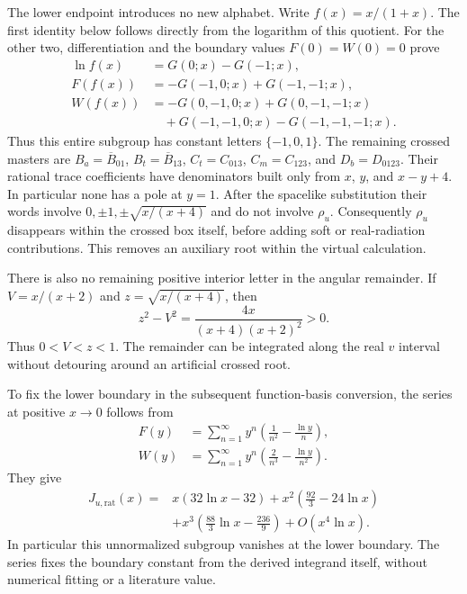The lower endpoint introduces no new alphabet. Write
$f(x)=x/(1+x)$. The first identity below follows directly from
the logarithm of this quotient. For the other two, differentiation
and the boundary values $F(0)=W(0)=0$ prove
\begin{align}
 \ln f(x)&=G(0;x)-G(-1;x),\\
 F(f(x))&=-G(-1,0;x)+G(-1,-1;x),\\
 W(f(x))&=-G(0,-1,0;x)+G(0,-1,-1;x)\\
        &\quad+G(-1,-1,0;x)-G(-1,-1,-1;x).
\end{align}
Thus this entire subgroup has constant letters $\{-1,0,1\}$.
The remaining crossed masters are
$B_a=\overline B_{01}$, $B_t=\overline B_{13}$,
$C_t=C_{013}$, $C_m=C_{123}$, and $D_b=D_{0123}$.
Their rational trace coefficients have denominators built only
from $x$, $y$, and $x-y+4$. In particular none has a pole at
$y=1$. After the spacelike substitution their words involve
$0,\pm1,\pm\sqrt{x/(x+4)}$ and do not involve $\rho_u$.
Consequently $\rho_u$ disappears within the crossed box itself,
before adding soft or real-radiation contributions. This removes an auxiliary root within the virtual calculation.

There is also no remaining positive interior letter in the angular
remainder. If $V=x/(x+2)$ and $z=\sqrt{x/(x+4)}$, then
\begin{equation}
 z^2-V^2=\frac{4x}{(x+4)(x+2)^2}>0.
\end{equation}
Thus $0<V<z<1$. The remainder can be integrated along the real
$v$ interval without detouring around an artificial crossed root.

To fix the lower boundary in the subsequent function-basis
conversion, the series at positive $x\to0$ follows from
\begin{align}
 F(y)&=\sum_{n=1}^{\infty}y^n
             \left(\frac1{n^2}-\frac{\ln y}{n}\right),\\
 W(y)&=\sum_{n=1}^{\infty}y^n
             \left(\frac2{n^3}-\frac{\ln y}{n^2}\right).
\end{align}
They give
\begin{align}
 J_{u,\mathrm{rat}}(x)
 ={}&x(32\ln x-32)+x^2\left(\frac{92}{3}-24\ln x\right)\\
 &+x^3\left(\frac{88}{3}\ln x-\frac{236}{9}\right)
             +O(x^4\ln x).
\end{align}
In particular this unnormalized subgroup vanishes at the lower
boundary. The series fixes the boundary constant from the derived
integrand itself, without numerical fitting or a literature value.
